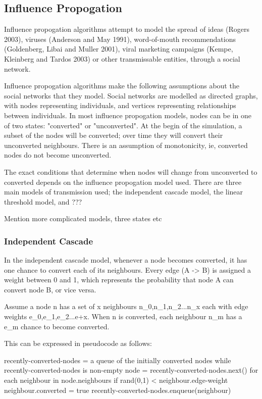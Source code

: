 \subsection{Influence Propogation}

 Influence propogation algorithms attempt to model the spread of ideas (Rogers 2003), viruses (Anderson and May 1991), word-of-mouth recommendations (Goldenberg, Libai and Muller 2001), viral marketing campaigns (Kempe, Kleinberg and Tardos 2003) or other transmissable entities, through a social network.

Influence propogation algorithms make the following assumptions about the social networks that they model. Social networks are modelled as directed graphs, with nodes representing individuals, and vertices representing relationships between individuals. In most influence propogation models, nodes can be in one of two states: "converted" or "unconverted". At the begin of the simulation, a subset of the nodes will be converted; over time they will convert their unconverted neighbours. There is an assumption of monotonicity, ie, converted nodes do not become unconverted.

 The exact conditions that determine when nodes will change from unconverted to converted depends on the influence propogation model used. There are three main models of transmission used; the independent cascade model, the linear threshold model, and ???

Mention more complicated models, three states etc

\subsubsection{Independent Cascade}
 In the independent cascade model, whenever a node becomes converted, it has one chance to convert each of its neighbours. Every edge (A -> B) is assigned a weight between 0 and 1, which represents the probability that node A can convert node B, or vice versa.

Assume a node n has a set of x neighbours n\_0,n\_1,n\_2...n\_x each with edge weights e\_0,e\_1,e\_2...e+x. When n is converted, each neighbour n\_m has a e\_m chance to become converted.

This can be expressed in pseudocode as follows:

recently-converted-nodes = a queue of the initially converted nodes
while recently-converted-nodes is non-empty {
  node = recently-converted-nodes.next()
  for each neighbour in node.neighbours {
    if rand(0,1) < neighbour.edge-weight {
      neighbour.converted = true
      recently-converted-nodes.enqueue(neighbour)
    }
  }
}

